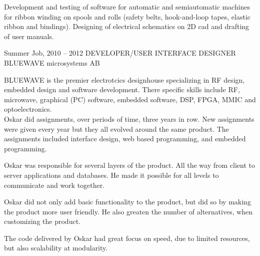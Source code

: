 \documentclass[fontsize=10pt]{tccv}
\begin{document}
\begin{eventlist}
Development and testing of software for automatic and semiautomatic
machines for ribbon winding on spools and rolls (safety belts,
hook-and-loop tapes, elastic ribbon and bindings). Designing of
electrical schematics on 2D cad and drafting of user manuals.

\item{Summer Job, 2010 -- 2012}
     {DEVELOPER/USER INTERFACE DESIGNER}
     {BLUEWAVE microsystems AB}


     BLUEWAVE is the premier electrotcics designhouse specializing in RF
     design, embedded design and software development. There specific skills
     include RF, microwave, graphical (PC) software, embedded software, DSP,
     FPGA, MMIC and optoelectronics. \\

     Oskar did assignments, over periods of time, three years in row. New
     assignments were given every year but they all evolved around the same
     product. The assignments included interface design, web based programming,
     and embedded programming.

     Oskar was responsible for several layers of the product. All the way from
     client to server applications and databases. He made it possible for all
     levels to communicate and work together.

     Oskar did not only add basic functionality to the product, but did so by
     making the product more user friendly. He also greaten the number of
     alternatives, when customizing the product.

     The code delivered by Oskar had great focus on speed, due to limited
     resources, but also scalability at modularity.

\end{eventlist}
\end{document}
